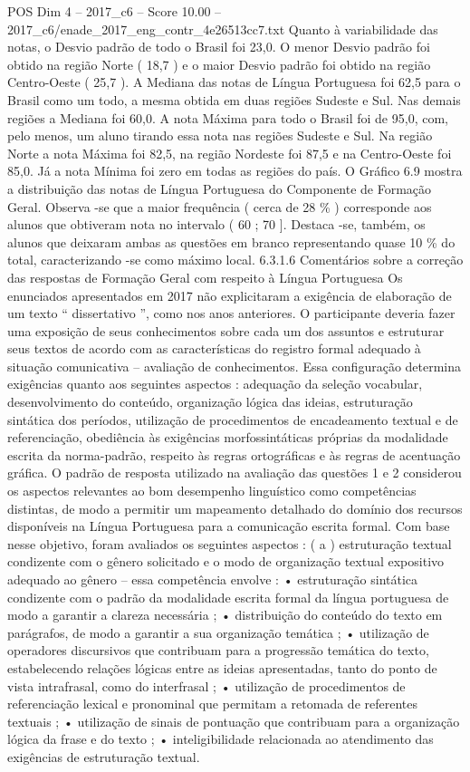 \begin{textsample}{POS Dim 4 – 2017\_c6 – Score 10.00 – 2017\_c6/enade\_2017\_eng\_contr\_4e26513cc7.txt}
Quanto à variabilidade das notas, o Desvio padrão de todo o Brasil foi 23,0.
O menor Desvio padrão foi obtido na região Norte ( 18,7 ) e o maior Desvio padrão foi obtido na região Centro-Oeste ( 25,7 ).
A Mediana das notas de Língua Portuguesa foi 62,5 para o Brasil como um todo, a mesma obtida em duas regiões Sudeste e Sul.
Nas demais regiões a Mediana foi 60,0.
A nota Máxima para todo o Brasil foi de 95,0, com, pelo menos, um aluno tirando essa nota nas regiões Sudeste e Sul.
Na região Norte a nota Máxima foi 82,5, na região Nordeste foi 87,5 e na Centro-Oeste foi 85,0.
Já a nota Mínima foi zero em todas as regiões do país.
O Gráfico 6.9 mostra a distribuição das notas de Língua Portuguesa do Componente de Formação Geral.
Observa -se que a maior frequência ( cerca de 28 \% ) corresponde aos alunos que obtiveram nota no intervalo ( 60 ; 70 ].
Destaca -se, também, os alunos que deixaram ambas as questões em branco representando quase 10 \% do total, caracterizando -se como máximo local. 6.3.1.6 Comentários sobre a correção das respostas de Formação Geral com respeito à Língua Portuguesa Os enunciados apresentados em 2017 não explicitaram a exigência de elaboração de um texto “ dissertativo ”, como nos anos anteriores.
O participante deveria fazer uma exposição de seus conhecimentos sobre cada um dos assuntos e estruturar seus textos de acordo com as características do registro formal adequado à situação comunicativa – avaliação de conhecimentos.
Essa configuração determina exigências quanto aos seguintes aspectos : adequação da seleção vocabular, desenvolvimento do conteúdo, organização lógica das ideias, estruturação sintática dos períodos, utilização de procedimentos de encadeamento textual e de referenciação, obediência às exigências morfossintáticas próprias da modalidade escrita da norma-padrão, respeito às regras ortográficas e às regras de acentuação gráfica.
O padrão de resposta utilizado na avaliação das questões 1 e 2 considerou os aspectos relevantes ao bom desempenho linguístico como competências distintas, de modo a permitir um mapeamento detalhado do domínio dos recursos disponíveis na Língua Portuguesa para a comunicação escrita formal.
Com base nesse objetivo, foram avaliados os seguintes aspectos : ( a ) estruturação textual condizente com o gênero solicitado e o modo de organização textual expositivo adequado ao gênero – essa competência envolve : • estruturação sintática condizente com o padrão da modalidade escrita formal da língua portuguesa de modo a garantir a clareza necessária ; • distribuição do conteúdo do texto em parágrafos, de modo a garantir a sua organização temática ; • utilização de operadores discursivos que contribuam para a progressão temática do texto, estabelecendo relações lógicas entre as ideias apresentadas, tanto do ponto de vista intrafrasal, como do interfrasal ; • utilização de procedimentos de referenciação lexical e pronominal que permitam a retomada de referentes textuais ; • utilização de sinais de pontuação que contribuam para a organização lógica da frase e do texto ; • inteligibilidade relacionada ao atendimento das exigências de estruturação textual.

\end{textsample}
